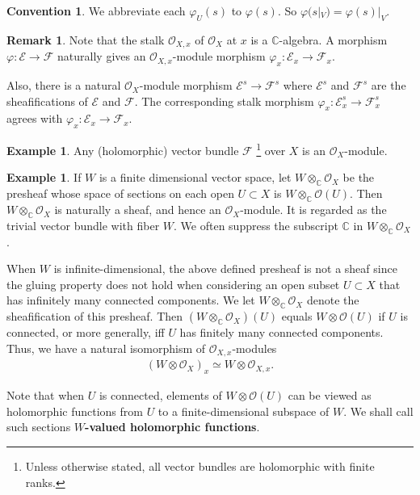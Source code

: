\documentclass[11pt,b5paper,notitlepage]{article}
\theoremstyle{definition}
\newtheorem{eg}[df]{Example}
\newtheorem{rem}[df]{Remark}
\newtheorem{cv}[df]{Convention}
\theoremstyle{plain}
\newcommand{\scr}{\mathscr}
\newcommand{\Cbb}{\mathbb C}
\numberwithin{equation}{section}
\begin{document}
\begin{cv}
	We abbreviate each $\varphi_U(s)$ to $\varphi(s)$. So $\varphi(s|_V)=\varphi(s)|_V$.
\end{cv}


\begin{rem}
	Note that the stalk $\scr O_{X,x}$ of $\scr O_X$ at $x$ is a $\Cbb$-algebra. A morphism $\varphi:\scr E\rightarrow\scr F$ naturally gives an  $\scr O_{X,x}$-module morphism $\varphi_x:\scr E_x\rightarrow\scr F_x$. 
	
	Also, there is a natural $\scr O_X$-module morphism $\scr E^s\rightarrow\scr F^s$ where $\scr E^s$ and $\scr F^s$ are the sheafifications of $\scr E$ and $\scr F$. The corresponding stalk morphism $\varphi_x:\scr E^s_x\rightarrow\scr F^s_x$ agrees with $\varphi_x:\scr E_x\rightarrow\scr F_x$.
\end{rem}


\begin{eg}
	Any (holomorphic) vector bundle $\scr F$ \footnote{Unless otherwise stated, all vector bundles are holomorphic with finite ranks.} over $X$ is an $\scr O_X$-module. 
\end{eg}


\begin{eg}
	If $W$ is a finite dimensional  vector space, let $W\otimes_\Cbb\scr O_X$ be the presheaf whose space of sections on each open $U\subset X$ is $W\otimes_\Cbb\scr O(U)$. Then $W\otimes_\Cbb\scr O_X$ is naturally a sheaf, and hence an $\scr O_X$-module. It is regarded as the trivial vector bundle with fiber $W$. We often suppress the subscript $\Cbb$ in $W\otimes_\Cbb\scr O_X$.
	
When $W$ is infinite-dimensional, the above defined presheaf is not a sheaf since the gluing property does not hold  when considering an open subset $U\subset X$ that has infinitely many connected components. 	 We let $W\otimes_\Cbb\scr O_X$ denote the sheafification of this presheaf. Then $(W\otimes_\Cbb\scr O_X)(U)$ equals $W\otimes\scr O(U)$ if $U$ is connected, or more generally, iff $U$ has finitely many connected components. Thus, we have a natural isomorphism of $\scr O_{X,x}$-modules
\begin{align*}
(W\otimes\scr O_X)_x\simeq W\otimes\scr O_{X,x}.	
\end{align*}

Note that when $U$ is connected, elements of $W\otimes\scr O(U)$ can be viewed as holomorphic functions from $U$ to a finite-dimensional subspace of $W$. We shall call such sections \textbf{$W$-valued holomorphic functions}.  \hfill\qedsymbol
\end{eg}
\end{document}
